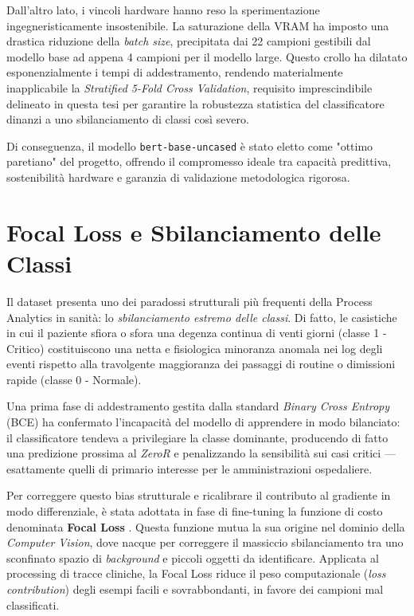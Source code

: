 Dall'altro lato, i vincoli hardware hanno reso la sperimentazione ingegneristicamente insostenibile. La saturazione della VRAM ha imposto una drastica riduzione della \textit{batch size}, precipitata dai 22 campioni gestibili dal modello base ad appena 4 campioni per il modello large. Questo crollo ha dilatato esponenzialmente i tempi di addestramento, rendendo materialmente inapplicabile la \textit{Stratified 5-Fold Cross Validation}, requisito imprescindibile delineato in questa tesi per garantire la robustezza statistica del classificatore dinanzi a uno sbilanciamento di classi così severo.

Di conseguenza, il modello \texttt{bert-base-uncased} è stato eletto come "ottimo paretiano" del progetto, offrendo il compromesso ideale tra capacità predittiva, sostenibilità hardware e garanzia di validazione metodologica rigorosa.

\section{Focal Loss e Sbilanciamento delle Classi}
Il dataset presenta uno dei paradossi strutturali più frequenti della Process Analytics in sanità: lo \textit{sbilanciamento estremo delle classi}. Di fatto, le casistiche in cui il paziente sfiora o sfora una degenza continua di venti giorni (classe 1 - Critico) costituiscono una netta e fisiologica minoranza anomala nei log degli eventi rispetto alla travolgente maggioranza dei passaggi di routine o dimissioni rapide (classe 0 - Normale).

Una prima fase di addestramento gestita dalla standard \textit{Binary Cross Entropy} (BCE) ha confermato l'incapacità del modello di apprendere in modo bilanciato: il classificatore tendeva a privilegiare la classe dominante, producendo di fatto una predizione prossima al \textit{ZeroR} e penalizzando la sensibilità sui casi critici — esattamente quelli di primario interesse per le amministrazioni ospedaliere.

Per correggere questo bias strutturale e ricalibrare il contributo al gradiente in modo differenziale, è stata adottata in fase di fine-tuning la funzione di costo denominata \textbf{Focal Loss} \cite{lin2017focal}. Questa funzione mutua la sua origine nel dominio della \textit{Computer Vision}, dove nacque per correggere il massiccio sbilanciamento tra uno sconfinato spazio di \textit{background} e piccoli oggetti da identificare. Applicata al processing di tracce cliniche, la Focal Loss riduce il peso computazionale (\textit{loss contribution}) degli esempi facili e sovrabbondanti, in favore dei campioni mal classificati.

